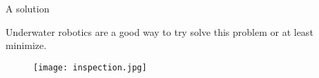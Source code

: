 \begin{frame}[t]{A solution} 

    Underwater robotics are a good way to try solve this problem or at least minimize.



    \begin{center}
        \begin{figure}
            \texttt{[image: inspection.jpg]}               
           
        \end{figure}

        \end{center}
    

\end{frame}


\begin{frame}{}
    \transdissolve[duration=0.5]
   
    \begin{center}
    \end{center}
\end{frame}


